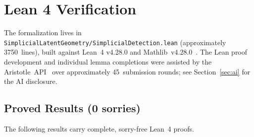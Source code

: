 \documentclass[reqno,12pt]{amsart}
\theoremstyle{plain}
\theoremstyle{definition}
\theoremstyle{remark}
\begin{document}
\section{Lean 4 Verification}\label{sec:lean}

The formalization lives in \texttt{SimplicialLatentGeometry/SimplicialDetection.lean}
(approximately 3750~lines), built against Lean~4 v4.28.0 and
Mathlib~v4.28.0~\cite{deMoura2021,Mathlib2020}. The Lean proof development and individual
lemma completions were assisted by the Aristotle~API~\cite{Aristotle2025} over approximately
45~submission rounds; see Section~\ref{sec:ai} for the AI disclosure.

\subsection{Proved Results (0 sorries)}

The following results carry complete, sorry-free Lean~4 proofs.
\end{document}
